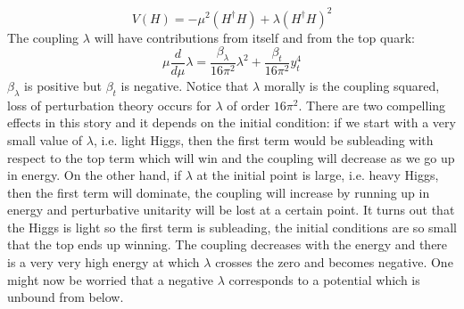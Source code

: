 \documentclass[../main.tex]{subfiles}
\begin{document}
\[
V(H)=-\mu^2(H^\dagger H)+\lambda(H^\dagger H)^2
\]
The coupling $\lambda$ will have contributions from itself and from the top quark:
\[
\mu\frac{d}{d\mu}\lambda=\frac{\beta_\lambda}{16\pi^2}\lambda^2+\frac{\beta_t}{16\pi^2}y_t^4
\]
$\beta_\lambda$ is positive but $\beta_t$ is negative. Notice that $\lambda$ morally is the coupling squared, loss of perturbation theory occurs for $\lambda$ of order $16\pi^2$. There are two compelling effects in this story and it depends on the initial condition: if we start with a very small value of $\lambda$, i.e. light Higgs, then the first term would be subleading with respect to the top term which will win and the coupling will decrease as we go up in energy. On the other hand, if $\lambda$ at the initial point is large, i.e. heavy Higgs, then the first term will dominate, the coupling will increase by running up in energy and perturbative unitarity will be lost at a certain point. It turns out that the Higgs is light so the first term is subleading, the initial conditions are so small that the top ends up winning. The coupling decreases with the energy and there is a very very high energy at which $\lambda$ crosses the zero and becomes negative. One might now be worried that a negative $\lambda$ corresponds to a potential which is unbound from below.
\end{document}
